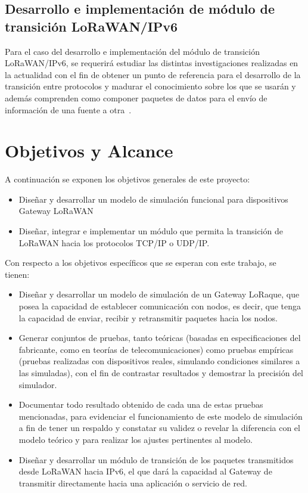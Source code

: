 \begin{justify}
\subsection{Desarrollo e implementación de módulo de transición LoRaWAN/IPv6} 
Para el caso del desarrollo e implementación del módulo de transición LoRaWAN/IPv6, se requerirá estudiar las distintas investigaciones realizadas en la actualidad con el fin de obtener un punto de referencia para el desarrollo de la transición entre protocolos y madurar el conocimiento sobre los que se usarán y además comprenden como  componer paquetes de datos para el envío de información de una fuente a otra~\cite{Juha}.

\section{Objetivos y Alcance}
A continuación se exponen los objetivos generales de este proyecto:\\
\begin{itemize}
\item Diseñar y desarrollar un modelo de simulación funcional para dispositivos Gateway LoRaWAN
\item Diseñar, integrar e implementar un módulo que permita la transición de LoRaWAN hacia los protocolos TCP/IP o UDP/IP.
\end{itemize}
Con respecto a los objetivos específicos que se esperan con este trabajo, se tienen:\
\begin{itemize}
\item Diseñar y desarrollar un modelo de simulación de un Gateway LoRaque, que posea la capacidad de establecer comunicación con nodos, es decir, que tenga la capacidad de enviar, recibir y retransmitir paquetes hacia los nodos.
\item Generar conjuntos de pruebas, tanto teóricas (basadas en especificaciones del fabricante, como en teorías de telecomunicaciones) como pruebas empíricas (pruebas realizadas con dispositivos reales, simulando condiciones similares a las simuladas), con el fin de contrastar resultados y demostrar la precisión del simulador.
\item Documentar todo resultado obtenido de cada una de estas pruebas mencionadas, para evidenciar el funcionamiento de este modelo de simulación a fin de tener un respaldo y constatar su validez o revelar la diferencia con el modelo teórico y para realizar los ajustes pertinentes al modelo.
\item Diseñar y desarrollar un módulo de transición de los paquetes transmitidos desde LoRaWAN hacia IPv6, el que dará la capacidad al Gateway de transmitir directamente hacia una aplicación o servicio de red.

\end{itemize}
\end{justify}
